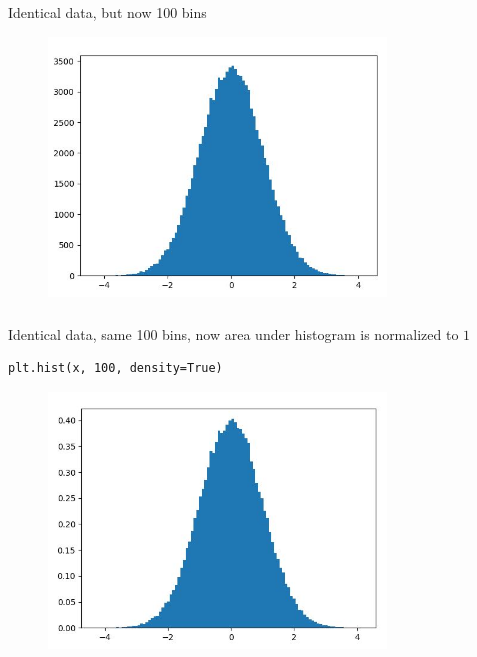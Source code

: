 \documentclass[english,14pt]{beamer}
\begin{document}

\begin{frame}[fragile]

\frametitle{}

Identical data, but now 100 bins

\begin{figure}[ht]
	\centering
	\includegraphics[width=0.8\textwidth]{figures/hist100BinsExample}
\end{figure}

\end{frame}


\begin{frame}[fragile]

\frametitle{}

Identical data, same 100 bins, now area under histogram is normalized to $1$

\begin{lstlisting}[style=CStyle,basicstyle=\scriptsize]
plt.hist(x, 100, density=True)
\end{lstlisting}

\begin{figure}[ht]
	\centering
	\includegraphics[width=0.8\textwidth]{figures/hist100BinsDensity}
\end{figure}

\end{frame}
\end{document}
